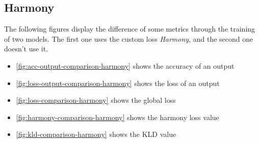 \documentclass[12pt]{report}
\begin{document}
\subsection{Harmony}
\label{sec:exp:harmony}

The following figures display the difference of some metrics through the training of two models.
The first one uses the custom loss \textit{Harmony}, and the second one doesn't use it.
\begin{itemize}
    \item \ref{fig:acc-output-comparison-harmony} shows the accuracy of an output
    \item \ref{fig:loss-output-comparison-harmony} shows the loss of an output
    \item \ref{fig:loss-comparison-harmony} shows the global loss
    \item \ref{fig:harmony-comparison-harmony} shows the harmony loss value
    \item \ref{fig:kld-comparison-harmony} shows the KLD value
\end{itemize}
\end{document}
